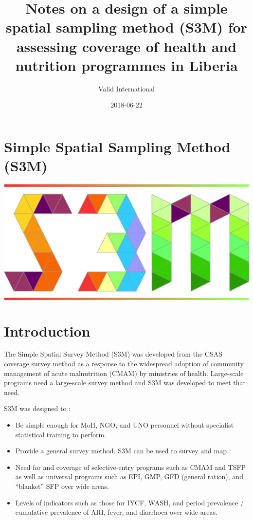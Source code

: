 \documentclass[12pt,a4paper]{book}
\title{Notes on a design of a simple spatial sampling method (S3M) for
assessing coverage of health and nutrition programmes in Liberia}
\author{Valid International}
\date{2018-06-22}
\theoremstyle{definition}
\theoremstyle{definition}
\theoremstyle{definition}
\theoremstyle{remark}
\begin{document}
\maketitle

{
\hypersetup{linkcolor=black}
\setcounter{tocdepth}{1}
\tableofcontents
}
\hypertarget{simple-spatial-sampling-method-s3m}{%
\chapter*{Simple Spatial Sampling Method
(S3M)}\label{simple-spatial-sampling-method-s3m}}

\includegraphics{figures/s3mlogo.png}

\hypertarget{introduction}{%
\chapter{Introduction}\label{introduction}}

The Simple Spatial Survey Method (S3M) was developed from the CSAS
coverage survey method as a response to the widespread adoption of
community management of acute malnutrition (CMAM) by ministries of
health. Large-scale programs need a large-scale survey method and S3M
was developed to meet that need.

S3M was designed to :

\begin{itemize}
\item
  Be simple enough for MoH, NGO, and UNO personnel without specialist
  statistical training to perform.
\item
  Provide a general survey method. S3M can be used to survey and map :
\item
  Need for and coverage of selective-entry programs such as CMAM and
  TSFP as well as universal programs such as EPI, GMP, GFD (general
  ration), and ``blanket'' SFP over wide areas.
\item
  Levels of indicators such as those for IYCF, WASH, and period
  prevalence / cumulative prevalence of ARI, fever, and diarrhoea over
  wide areas.
\end{itemize}
\end{document}
